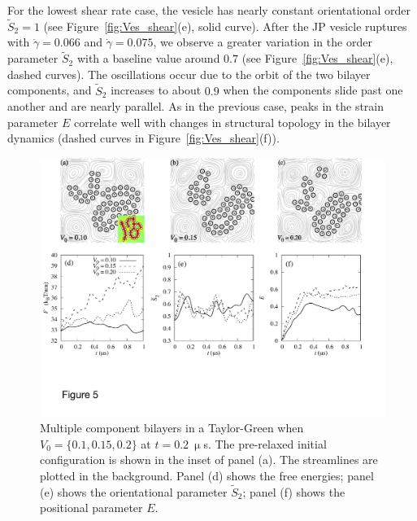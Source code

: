 \documentclass[prb,preprint,showpacs,preprintnumbers,amsmath,amssymb,longbibliography]{revtex4-1}
\begin{document}
For the lowest shear rate case, the vesicle has nearly constant
orientational order $\tilde S_2 = 1$ (see Figure~\ref{fig:Ves_shear}(e),
solid curve). After the JP vesicle ruptures with $\dot\gamma= 0.066$ and
$\dot \gamma= 0.075$, we observe a greater variation in the order
parameter $\tilde{S}_2$ with a baseline value around $0.7$ (see
Figure~\ref{fig:Ves_shear}(e), dashed curves). The oscillations occur
due to the orbit of the two bilayer components, and $\tilde{S}_2$
increases to about $0.9$ when the components slide past one another and
are nearly parallel.
%
As in the previous case, peaks in the strain parameter $E$ correlate
well with changes in structural topology in the bilayer dynamics (dashed
curves in Figure~\ref{fig:Ves_shear}(f)).


%
\begin{figure}
  \begin{center}
    \includegraphics[width=1.0\textwidth]{Figures/Figure5.pdf}    
  \end{center}
  \vspace{-20pt}  
  \caption{\label{fig:BC1_TG} Multiple component bilayers in a
  Taylor-Green when $V_0 = \{0.1, 0.15, 0.2\}$ at $t=0.2\ \upmu$s. The
  pre-relaxed initial configuration is shown in the inset of panel (a).
  The streamlines are plotted in the background. Panel (d) shows the
  free energies; panel (e) shows the orientational parameter
  $\tilde{S}_2$; panel (f) shows the positional parameter $E$.}
\end{figure}
%
\end{document}
